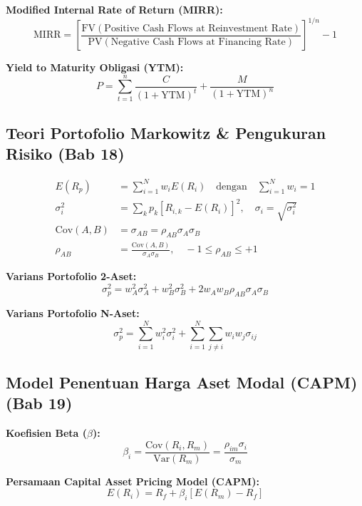 \documentclass[10pt,a4paper]{article}
\begin{document}
\textbf{Modified Internal Rate of Return (MIRR):}
\begin{equation}
\text{MIRR} = \left[\frac{\text{FV}(\text{Positive Cash Flows at Reinvestment Rate})}{\text{PV}(\text{Negative Cash Flows at Financing Rate})}\right]^{1/n} - 1
\end{equation}

\textbf{Yield to Maturity Obligasi (YTM):}
\begin{equation}
P = \sum_{t=1}^n \frac{C}{(1 + \text{YTM})^t} + \frac{M}{(1 + \text{YTM})^n}
\end{equation}

\subsection{Teori Portofolio Markowitz \& Pengukuran Risiko (Bab 18)}

\begin{align}
E(R_p) &= \sum_{i=1}^N w_i E(R_i) \quad \text{dengan} \quad \sum_{i=1}^N w_i = 1 \\
\sigma_i^2 &= \sum_{k} p_k [R_{i,k} - E(R_i)]^2, \quad \sigma_i = \sqrt{\sigma_i^2} \\
\text{Cov}(A,B) &= \sigma_{AB} = \rho_{AB} \sigma_A \sigma_B \\
\rho_{AB} &= \frac{\text{Cov}(A,B)}{\sigma_A \sigma_B}, \quad -1 \le \rho_{AB} \le +1
\end{align}

\textbf{Varians Portofolio 2-Aset:}
\begin{equation}
\sigma_p^2 = w_A^2 \sigma_A^2 + w_B^2 \sigma_B^2 + 2 w_A w_B \rho_{AB} \sigma_A \sigma_B
\end{equation}

\textbf{Varians Portofolio N-Aset:}
\begin{equation}
\sigma_p^2 = \sum_{i=1}^N w_i^2 \sigma_i^2 + \sum_{i=1}^N \sum_{j \ne i} w_i w_j \sigma_{ij}
\end{equation}

\subsection{Model Penentuan Harga Aset Modal (CAPM) (Bab 19)}

\textbf{Koefisien Beta ($\beta$):}
\begin{equation}
\beta_i = \frac{\text{Cov}(R_i, R_m)}{\text{Var}(R_m)} = \frac{\rho_{im} \sigma_i}{\sigma_m}
\end{equation}

\textbf{Persamaan Capital Asset Pricing Model (CAPM):}
\begin{equation}
\boxed{E(R_i) = R_f + \beta_i \left[E(R_m) - R_f\right]}
\end{equation}
\end{document}
